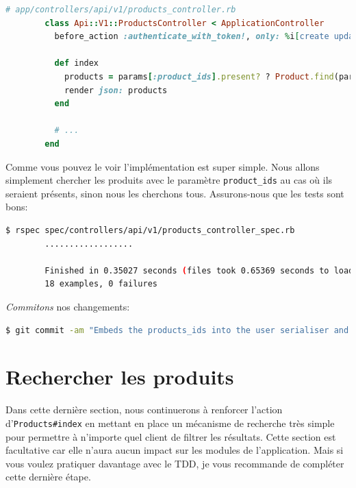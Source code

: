 \documentclass[]{report}
\begin{document}
      \begin{scriptsize}
        \begin{lstlisting}[language=ruby]
        # app/controllers/api/v1/products_controller.rb
        class Api::V1::ProductsController < ApplicationController
          before_action :authenticate_with_token!, only: %i[create update destroy]

          def index
            products = params[:product_ids].present? ? Product.find(params[:product_ids]) : Product.all
            render json: products
          end

          # ...
        end
        \end{lstlisting}
      \end{scriptsize}

      Comme vous pouvez le voir l'implémentation est super simple. Nous allons simplement chercher les produits avec le paramètre \verb|product_ids| au cas où ils seraient présents, sinon nous les cherchons tous. Assurons-nous que les tests sont bons:

      \begin{scriptsize}
        \begin{lstlisting}[language=bash]
        $ rspec spec/controllers/api/v1/products_controller_spec.rb
        ..................

        Finished in 0.35027 seconds (files took 0.65369 seconds to load)
        18 examples, 0 failures
        \end{lstlisting}
      \end{scriptsize}

      \textit{Commitons} nos changements:

      \begin{scriptsize}
        \begin{lstlisting}[language=bash]
        $ git commit -am "Embeds the products_ids into the user serialiser and fetches the correct products from the index action endpoint"
        \end{lstlisting}
      \end{scriptsize}

  \section{Rechercher les produits}

    Dans cette dernière section, nous continuerons à renforcer l'action d'\verb|Products#index| en mettant en place un mécanisme de recherche très simple pour permettre à n'importe quel client de filtrer les résultats. Cette section est facultative car elle n'aura aucun impact sur les modules de l'application. Mais si vous voulez pratiquer davantage avec le TDD, je vous recommande de compléter cette dernière étape.
\end{document}

